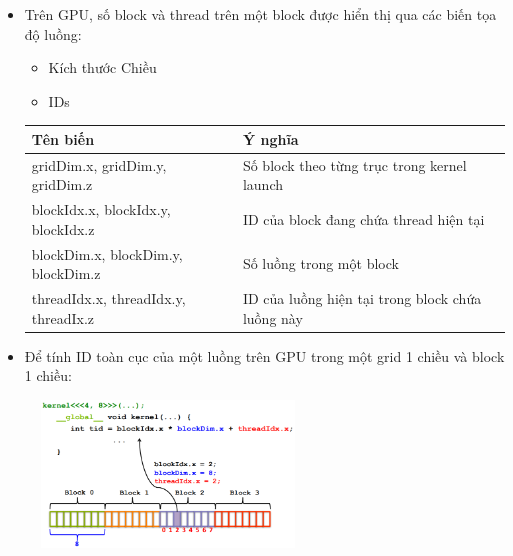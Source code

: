\documentclass[14pt, a4paper]{article}
\numberwithin{equation}{section}
\numberwithin{figure}{section}
\numberwithin{dl}{section}
\numberwithin{md}{section}
\numberwithin{bd}{section}
\numberwithin{dn}{section}
\numberwithin{hq}{section}
\begin{document}
    \begin{itemize}
        \item Trên GPU, số block và thread trên một block được hiển thị qua các biến tọa độ luồng:
        \begin{itemize}
            \item Kích thước Chiều
            \item IDs
        \end{itemize}
        \begin{table}[H]
            \centering
            \resizebox{\columnwidth}{!} {
                \begin{tabular}{|l|l|}
                    \hline
                    Tên biến & Ý nghĩa \\
                    \hline
                    gridDim.x, gridDim.y, gridDim.z & Số block theo từng trục trong kernel launch \\
                    \hline
                    blockIdx.x, blockIdx.y, blockIdx.z & ID của block đang chứa thread hiện tại \\
                    \hline
                    blockDim.x, blockDim.y, blockDim.z & Số luồng trong một block \\
                    \hline
                    threadIdx.x, threadIdx.y, threadIx.z & ID của luồng hiện tại trong block chứa luồng này \\
                    \hline
                \end{tabular}
            }
    \end{table}
\end{itemize}

\begin{itemize}
    \item Để tính ID toàn cục của một luồng trên GPU trong một grid 1 chiều và block 1 chiều:
\end{itemize}
\begin{figure}[H]
    \centering
    \includegraphics[width=0.6\textwidth]{figures/CUDA/Global_ThreadID_1d_Grid_1d_Block.png}
\end{figure}
\end{document}
